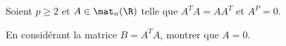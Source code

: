 \begin{enonce}
\begin{exercise}[ID={RMS132 E1151},subtitle={CCINP PSI 2021},tags={}, difficulty={0}]
  Soient $p\geq 2$ et $A\in\mat_n(\R)$ telle que $A^T A = AA^T$ et $A^P=0$.

  En considérant la matrice $B = A^TA$, montrer que $A=0$.
\end{exercise}
\begin{solution}
\end{solution}
\end{enonce}

